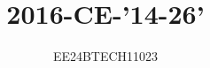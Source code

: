 \documentclass[journal]{IEEEtran}
\begin{document}

\vspace{3cm}
\title{2016-CE-'14-26'}
\author{EE24BTECH11023}

{\let\newpage\relax\maketitle}

\renewcommand{\thefigure}{\theenumi}
\renewcommand{\thetable}{\theenumi}
\setlength{\intextsep}{10pt} %


\renewcommand{\thetable}{\theenumi}
\end{document}

